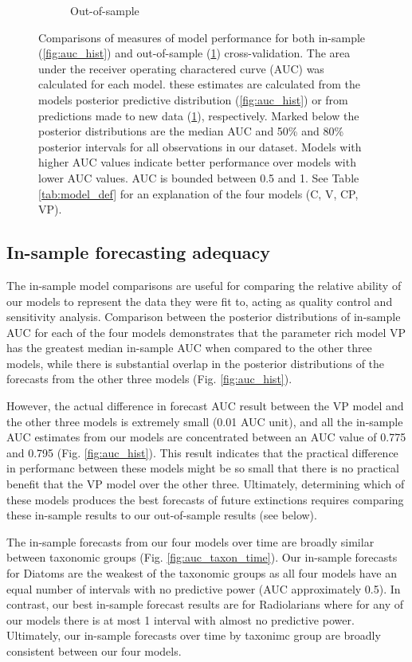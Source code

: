 \documentclass[12pt,letterpaper]{article}
\begin{document}
\begin{refsection}
\begin{figure}[ht]
\begin{subfigure}[ht]{0.45\textwidth}
  \caption{Out-of-sample}
  \label{fig:fold_auc}
 \end{subfigure}
 \caption{Comparisons of measures of model performance for both in-sample (\ref{fig:auc_hist}) and out-of-sample (\ref{fig:fold_auc}) cross-validation. The area under the receiver operating charactered curve (AUC) was calculated for each model. these estimates are calculated from the models posterior predictive distribution (\ref{fig:auc_hist}) or from predictions made to new data (\ref{fig:fold_auc}), respectively. Marked below the posterior distributions are the median AUC and 50\% and 80\% posterior intervals for all observations in our dataset. Models with higher AUC values indicate better performance over models with lower AUC values. AUC is bounded between 0.5 and 1. See Table \ref{tab:model_def} for an explanation of the four models (C, V, CP, VP).}
 \label{fig:auc_compare}
\end{figure}

\subsection{In-sample forecasting adequacy}

The in-sample model comparisons are useful for comparing the relative ability of our models to represent the data they were fit to, acting as quality control and sensitivity analysis. Comparison between the posterior distributions of in-sample AUC for each of the four models demonstrates that the parameter rich model VP has the greatest median in-sample AUC when compared to the other three models, while there is substantial overlap in the posterior distributions of the forecasts from the other three models (Fig. \ref{fig:auc_hist}). 

However, the actual difference in forecast AUC result between the VP model and the other three models is extremely small (0.01 AUC unit), and all the in-sample AUC estimates from our models are concentrated between an AUC value of 0.775 and 0.795 (Fig. \ref{fig:auc_hist}). This result indicates that the practical difference in performanc between these models might be so small that there is no practical benefit that the VP model over the other three. Ultimately, determining which of these models produces the best forecasts of future extinctions requires comparing these in-sample results to our out-of-sample results (see below).

The in-sample forecasts from our four models over time are broadly similar between taxonomic groups (Fig. \ref{fig:auc_taxon_time}). Our in-sample forecasts for Diatoms are the weakest of the taxonomic groups as all four models have an equal number of intervals with no predictive power (AUC approximately 0.5). In contrast, our best in-sample forecast results are for Radiolarians where for any of our models there is at most 1 interval with almost no predictive power. Ultimately, our in-sample forecasts over time by taxonimc group are broadly consistent between our four models.


\end{refsection}
\end{document}
